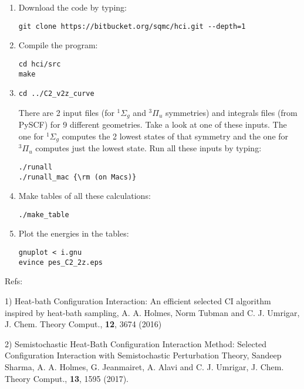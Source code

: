 \documentclass[12pt,aps,prb,groupedaddress,amsmath,amssymb]{revtex4-1}
\begin{document}
\begin{enumerate}
\item Download the code by typing:\vspace{-5mm}
\begin{verbatim}
git clone https://bitbucket.org/sqmc/hci.git --depth=1
\end{verbatim}
\item
Compile the program:\vspace{-5mm}
\begin{verbatim}
cd hci/src
make
\end{verbatim}
\item
\begin{verbatim}
cd ../C2_v2z_curve
\end{verbatim}
There are 2 input files (for $^1\Sigma_g$ and $^3\Pi_u$ symmetries) and integrals files (from PySCF) for 9 different geometries.  Take a look at one of these inputs.
The one for $^1\Sigma_g$ computes the 2 lowest states of that symmetry and the one for $^3\Pi_u$ computes just the lowest state.
Run all these inputs by typing:
\begin{verbatim}
./runall
./runall_mac {\rm (on Macs)}
\end{verbatim}
\item Make tables of all these calculations:\vspace{-5mm}
\begin{verbatim}
./make_table
\end{verbatim}
\item Plot the energies in the tables:\vspace{-5mm}
\begin{verbatim}
gnuplot < i.gnu
evince pes_C2_2z.eps
\end{verbatim}
\end{enumerate}

\vskip 9mm
Refs:
\small


1) Heat-bath Configuration Interaction: An efficient selected CI algorithm inspired by heat-bath sampling,
A. A. Holmes, Norm Tubman and C. J. Umrigar, J. Chem. Theory Comput., {\bf 12}, 3674 (2016)

2) Semistochastic Heat-Bath Configuration Interaction Method:
Selected Configuration Interaction with Semistochastic Perturbation Theory,
Sandeep Sharma, A. A. Holmes, G. Jeanmairet, A. Alavi and C. J. Umrigar, J. Chem. Theory Comput., {\bf 13}, 1595 (2017).
\end{document}
